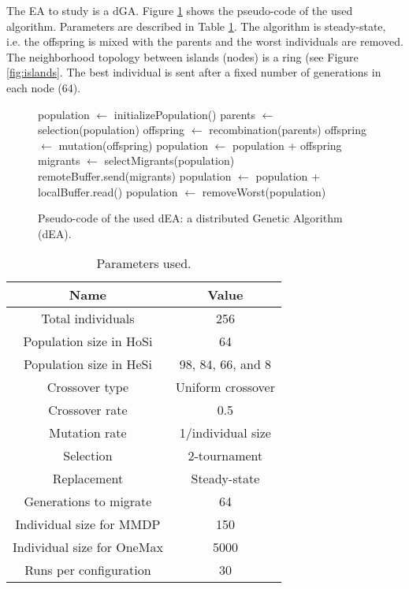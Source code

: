 The EA to study is a dGA. Figure \ref{fig:EA} shows the pseudo-code of the used algorithm. Parameters are described in Table \ref{table:parameters}. The algorithm is steady-state, i.e. the offspring is mixed with the parents and the worst individuals are removed. The neighborhood topology between islands (nodes) is a ring (see Figure \ref{fig:islands}. The best individual is sent after a fixed number of generations in each node (64). %



\begin{figure}

\begin{algorithmic}
\STATE population $\gets$ initializePopulation()
    \STATE parents $\gets$ selection(population)
    \STATE offspring $\gets$ recombination(parents)
    \STATE offspring $\gets$ mutation(offspring)
    \STATE population $\gets$ population + offspring
      \STATE migrants $\gets$ selectMigrants(population)
      \STATE remoteBuffer.send(migrants)
    \ENDIF
      \STATE population $\gets$ population + localBuffer.read()
    \ENDIF
    \STATE population $\gets$ removeWorst(population)
\ENDWHILE

\end{algorithmic}
\caption{Pseudo-code of the used dEA: a distributed Genetic Algorithm (dEA).}
\label{fig:EA}
\end{figure}


\begin{table}
\centering
\caption{Parameters used.}
\begin{tabular}{|c|c|} \hline
Name & Value\\ \hline
Total individuals & 256\\ \hline
Population size in HoSi & 64 \\ \hline
Population size in HeSi & 98, 84, 66, and 8\\ \hline
Crossover type & Uniform crossover \\ \hline
Crossover rate & 0.5\\ \hline
Mutation rate & 1/individual size\\ \hline
Selection & 2-tournament \\ \hline
Replacement & Steady-state\\ \hline
Generations to migrate & 64 \\ \hline
Individual size for MMDP & 150 \\ \hline
Individual size for OneMax & 5000 \\
Runs per configuration & 30 \\ 

\hline\end{tabular}
\label{table:parameters}
\end{table}

